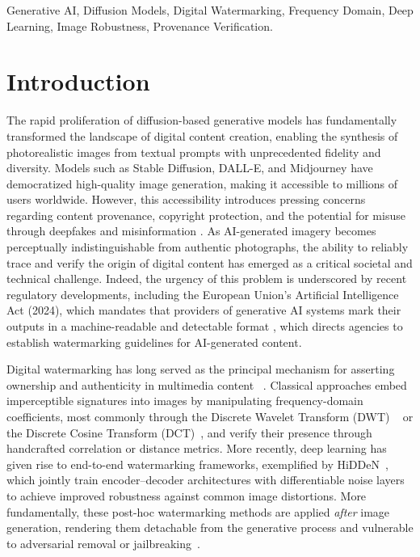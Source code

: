 \documentclass[lettersize,journal,review]{IEEEtran}
\begin{document}
\begin{IEEEkeywords}
Generative AI, Diffusion Models, Digital Watermarking, Frequency Domain, Deep Learning, Image Robustness, Provenance Verification.
\end{IEEEkeywords}

\section{Introduction}


The rapid proliferation of diffusion-based generative models \cite{ho2020denoising,rombach2022high} has fundamentally transformed the landscape of digital content creation, enabling the synthesis of photorealistic images from textual prompts with unprecedented fidelity and diversity. Models such as Stable Diffusion, DALL-E, and Midjourney have democratized high-quality image generation, making it accessible to millions of users worldwide. However, this accessibility introduces pressing concerns regarding content provenance, copyright protection, and the potential for misuse through deepfakes and misinformation \cite{liu2025review, gupta2024comprehensive,bird2023typology,Rijsbosch2025watermarking}. As AI-generated imagery becomes perceptually indistinguishable from authentic photographs, the ability to reliably trace and verify the origin of digital content has emerged as a critical societal and technical challenge. Indeed, the urgency of this problem is underscored by recent regulatory developments, including the European Union's Artificial Intelligence Act (2024), which mandates that providers of generative AI systems mark their outputs in a machine-readable and detectable format \cite{euaiact2024}, which directs agencies to establish watermarking guidelines for AI-generated content.

Digital watermarking has long served as the principal mechanism for asserting ownership and authenticity in multimedia content ~\cite{barni2001improved,cox2008digital}. Classical approaches embed imperceptible signatures into images by manipulating frequency-domain coefficients, most commonly through the Discrete Wavelet Transform (DWT) ~\cite{raval2003discrete,tian2023multi} or the Discrete Cosine Transform (DCT)~\cite{shensa2002discrete}, and verify their presence through handcrafted correlation or distance metrics. More recently, deep learning has given rise to end-to-end watermarking frameworks, exemplified by HiDDeN~\cite{zhu2018hidden}, which jointly train encoder–decoder architectures with differentiable noise layers to achieve improved robustness against common image distortions. More fundamentally, these post-hoc watermarking methods are applied \emph{after} image generation, rendering them detachable from the generative process and vulnerable to adversarial removal or jailbreaking~\cite{zhao2024invisible}.
\end{document}
